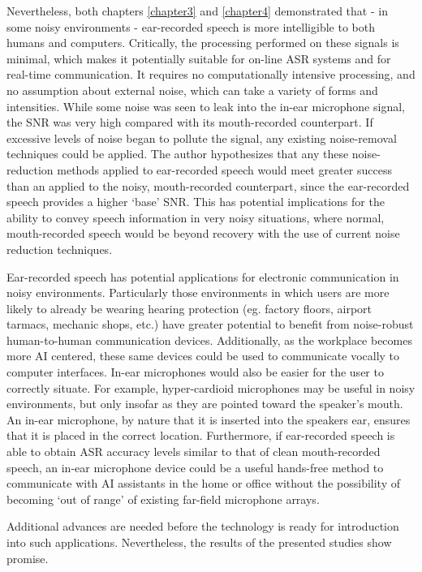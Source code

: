 Nevertheless, both chapters \ref{chapter3} and \ref{chapter4} demonstrated that - in some noisy environments - ear-recorded speech is more intelligible to both humans and computers.  Critically, the processing performed on these signals is minimal, which makes it potentially suitable for on-line ASR systems and for real-time communication.  It requires no computationally intensive processing, and no assumption about external noise, which can take a variety of forms and intensities.  While some noise was seen to leak into the in-ear microphone signal, the SNR was very high compared with its mouth-recorded counterpart.  If excessive levels of noise began to pollute the signal, any existing noise-removal techniques could be applied.  The author hypothesizes that any these noise-reduction methods applied to ear-recorded speech would meet greater success than an applied to the noisy, mouth-recorded counterpart, since the ear-recorded speech provides a higher `base' SNR.  This has potential implications for the ability to convey speech information in very noisy situations, where normal, mouth-recorded speech would be beyond recovery with the use of current noise reduction techniques.

Ear-recorded speech has potential applications for electronic communication in noisy environments.  Particularly those environments in which users are more likely to already be wearing hearing protection (eg. factory floors, airport tarmacs, mechanic shops, etc.) have greater potential to benefit from noise-robust human-to-human communication devices.  Additionally, as the workplace becomes more AI centered, these same devices could be used to communicate vocally to computer interfaces.  In-ear microphones would also be easier for the user to correctly situate.  For example, hyper-cardioid microphones may be useful in noisy environments, but only insofar as they are pointed toward the speaker's mouth.  An in-ear microphone, by nature that it is inserted into the speakers ear, ensures that it is placed in the correct location.  Furthermore, if ear-recorded speech is able to obtain ASR accuracy levels similar to that of clean mouth-recorded speech, an in-ear microphone device could be a useful hands-free method to communicate with AI assistants in the home or office without the possibility of becoming `out of range' of existing far-field microphone arrays.

Additional advances are needed before the technology is ready for introduction into such applications.  Nevertheless, the results of the presented studies show promise.

